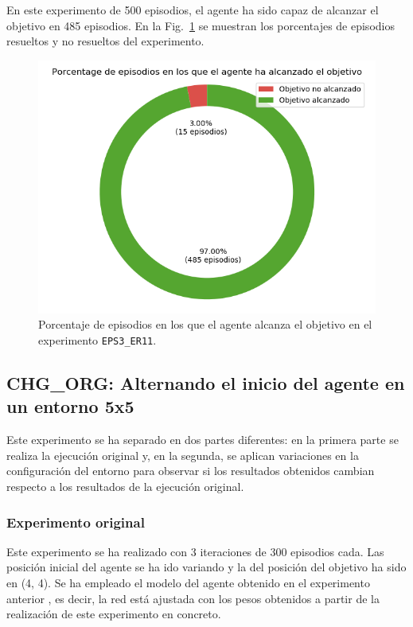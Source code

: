 En este experimento de 500 episodios, el agente ha sido capaz de alcanzar el objetivo en 485 episodios. En la Fig.~\ref{fig:dim5_lr0.01_ep1_porcentajeResuelto} se muestran los porcentajes de episodios resueltos y no resueltos del experimento. 

\begin{figure}
    \centering
    \includegraphics[scale=0.4]{cap5_experimentacion/images/dim5_lr0.01_ep1_porcentajeResuelto.png}
    \caption{Porcentaje de episodios en los que el agente alcanza el objetivo en el experimento \texttt{EPS3\_ER11}.}
    \label{fig:dim5_lr0.01_ep1_porcentajeResuelto}
\end{figure}

\subsection{CHG\_ORG: Alternando el inicio del agente en un entorno 5x5} \label{CHG_ORG}

Este experimento se ha separado en dos partes diferentes: en la primera parte se realiza la ejecución original y, en la segunda, se aplican variaciones en la configuración del entorno para observar si los resultados obtenidos cambian respecto a los resultados de la ejecución original. 

\subsubsection{Experimento original}

Este experimento se ha realizado con 3 iteraciones de 300 episodios cada. Las posición inicial del agente se ha ido variando y la del posición del objetivo ha sido en (4, 4). Se ha empleado el modelo del agente obtenido en el experimento anterior , es decir, la red está ajustada con los pesos obtenidos a partir de la realización de este experimento en concreto. \\


